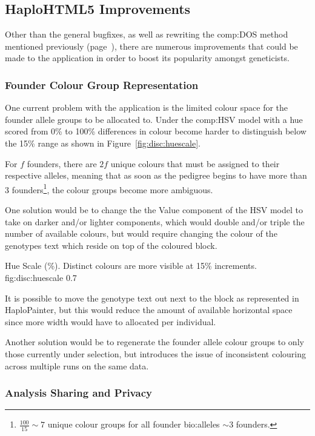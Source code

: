 \subsection{HaploHTML5 Improvements}

Other than the general bugfixes, as well as rewriting the \gls{comp:DOS} method mentioned previously (page~\pageref{ref:disc:dos}), there are numerous improvements that could be made to the application in order to boost its popularity amongst geneticists.


\subsubsection{Founder Colour Group Representation}
One current problem with the application is the limited colour space for the founder allele groups to be allocated to. Under the \gls{comp:HSV} model with a hue scored from 0\% to 100\% differences in colour become harder to distinguish below the 15\% range as shown in Figure~\ref{fig:disc:huescale}. 

For $f$ founders, there are $2f$ unique colours that must be assigned to their respective alleles, meaning that as soon as the pedigree begins to have more than 3 founders\footnote{$ \frac{100}{15} \sim 7 $ unique colour groups for all founder \gls{bio:alleles} $ \sim 3$ founders.}, the colour groups become more ambiguous.

\enlargethispage{\baselineskip}

One solution would be to change the the Value component of the HSV model to take on darker and/or lighter components, which would double and/or triple the number of available colours, but would require changing the colour of the genotypes text which reside on top of the coloured block. 

{Hue Scale (\%). Distinct colours are more visible at 15\% increments.}
{fig:disc:huescale}
{0.7}{}

It is possible to move the genotype text out next to the block as represented in HaploPainter, but this would reduce the amount of available horizontal space since more width would have to allocated per individual.

Another solution would be to regenerate the founder allele colour groups to only those currently under selection, but introduces the issue of inconsistent colouring across multiple runs on the same data.


\subsubsection{Analysis Sharing and Privacy}

